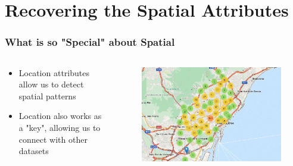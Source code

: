 \documentclass[hyperref={pdfpagelabels=true}]{beamer}
\begin{document}
\section{Recovering the Spatial Attributes} 

\begin{frame}
\frametitle{What is so "Special" about Spatial}
\begin{columns}
  \begin{column}{0.5\textwidth}
    \begin{itemize}
      \item<2-> Location attributes allow us to detect spatial patterns
      \item<2-> Location also works as a "key", allowing us to connect with other datasets
    \end{itemize}    
  \end{column}
  
  \begin{column}{0.5\textwidth}
      \begin{figure}  
	\includegraphics[width=\textwidth]{bettermap.png}\\
       \end{figure}  
  \end{column}  
\end{columns}
\end{frame}
\end{document}
